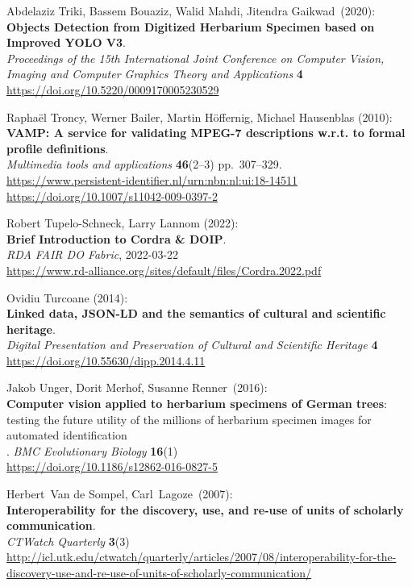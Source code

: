 \begin{thebibliography}{9}
Abdelaziz Triki, Bassem Bouaziz, Walid Mahdi, Jitendra Gaikwad~(2020):\\
\textbf{Objects Detection from Digitized Herbarium Specimen based on Improved
YOLO V3}.\\
\emph{Proceedings of the 15th International Joint Conference on Computer Vision, Imaging and Computer Graphics Theory and Applications} 
\textbf{4}\\
\url{https://doi.org/10.5220/0009170005230529}

Raphaël Troncy, Werner Bailer, Martin Höffernig, Michael Hausenblas (2010):\\
\textbf{VAMP: A service for validating MPEG-7 descriptions w.r.t. to
formal profile definitions}.\\
\emph{Multimedia tools and applications} \textbf{46}(2--3)
pp.~307--329.\\
\url{https://www.persistent-identifier.nl/urn:nbn:nl:ui:18-14511}\\
\url{https://doi.org/10.1007/s11042-009-0397-2}

Robert Tupelo-Schneck, Larry Lannom (2022):\\
\textbf{Brief Introduction to Cordra \& DOIP}.\\
\emph{RDA FAIR DO Fabric}, 2022-03-22\\
\url{https://www.rd-alliance.org/sites/default/files/Cordra.2022.pdf}

Ovidiu Turcoane (2014): \\
\textbf{Linked data, {JSON-LD} and the semantics of cultural and scientific heritage}. \\
\emph{Digital Presentation and Preservation of Cultural and Scientific Heritage} \textbf{4} \\
\url{https://doi.org/10.55630/dipp.2014.4.11}

Jakob Unger, Dorit Merhof, Susanne Renner~(2016):\\
\textbf{Computer vision applied to
herbarium specimens of German trees}: testing the future utility of the
millions of herbarium specimen images for automated identification\\. 
\emph{BMC Evolutionary Biology} \textbf{16}(1)\\
\url{https://doi.org/10.1186/s12862-016-0827-5}

Herbert~Van de Sompel, Carl~Lagoze~(2007):\\
\textbf{Interoperability for the discovery, use, and re-use of units of
scholarly communication}.\\
\emph{CTWatch Quarterly} \textbf{3}(3)\\
\url{http://icl.utk.edu/ctwatch/quarterly/articles/2007/08/interoperability-for-the-discovery-use-and-re-use-of-units-of-scholarly-communication/}


\end{thebibliography}
